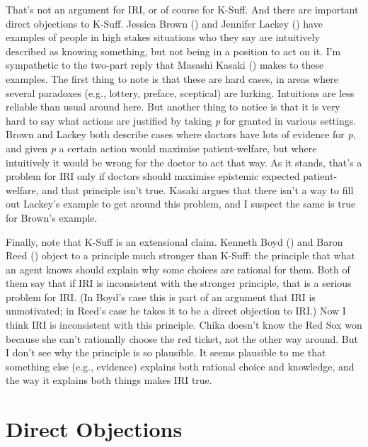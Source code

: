 \documentclass[
  10pt,
  letterpaper,
  DIV=11,
  numbers=noendperiod,
  twoside]{scrartcl}
\begin{document}
That's not an argument for IRI, or of course for K-Suff. And there are
important direct objections to K-Suff. Jessica Brown
() and Jennifer Lackey
() have examples of people in high stakes
situations who they say are intuitively described as knowing something,
but not being in a position to act on it. I'm sympathetic to the
two-part reply that Masashi Kasaki ()
makes to these examples. The first thing to note is that these are hard
cases, in areas where several paradoxes (e.g., lottery, preface,
sceptical) are lurking. Intuitions are less reliable than usual around
here. But another thing to notice is that it is very hard to say what
actions are justified by taking \emph{p} for granted in various
settings. Brown and Lackey both describe cases where doctors have lots
of evidence for \emph{p}, and given \emph{p} a certain action would
maximise patient-welfare, but where intuitively it would be wrong for
the doctor to act that way. As it stands, that's a problem for IRI only
if doctors should maximise epistemic expected patient-welfare, and that
principle isn't true. Kasaki argues that there isn't a way to fill out
Lackey's example to get around this problem, and I suspect the same is
true for Brown's example.

Finally, note that K-Suff is an extensional claim. Kenneth Boyd
() and Baron Reed
() object to a principle much stronger than
K-Suff: the principle that what an agent knows should explain why some
choices are rational for them. Both of them say that if IRI is
inconsistent with the stronger principle, that is a serious problem for
IRI. (In Boyd's case this is part of an argument that IRI is
unmotivated; in Reed's case he takes it to be a direct objection to
IRI.) Now I think IRI is inconsistent with this principle. Chika doesn't
know the Red Sox won because she can't rationally choose the red ticket,
not the other way around. But I don't see why the principle is so
plausible. It seems plausible to me that something else (e.g., evidence)
explains both rational choice and knowledge, and the way it explains
both things makes IRI true.

\section{Direct Objections}\label{directobjections}
\end{document}
